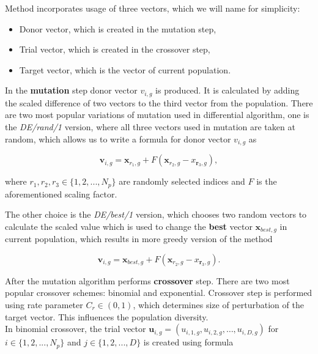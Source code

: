 \documentclass[12pt,a4paper,openany]{book}
\begin{document}
\noindent Method incorporates usage of three vectors, which we will name for simplicity:

\begin{itemize}
\item Donor vector, which is created in the mutation step,
\item Trial vector, which is created in the crossover step,
\item Target vector, which is the vector of current population.
\end{itemize}


\noindent In the \textbf{mutation} step donor vector $v_{i, g}$ is produced. It is calculated by adding the scaled difference of two vectors to the third vector from the population. There are two most popular variations of mutation used in differential algorithm, one is the \textit{DE/rand/1} version, where all three vectors used in mutation are taken at random, which allows us to write a formula for donor vector  $v_{i, g}$ as

\begin{equation}
\mathbf{v}_{i, g}=\mathbf{x}_{r_{1}, g}+F\left(\mathbf{x}_{r_{2}, g}-x_{\mathbf{r}_{3}, g}\right),
\end{equation}

\noindent where $r_{1}, r_{2},r_{3} \in \{1, 2, ..., N_{p}\}$ are randomly selected indices and $F$ is the aforementioned scaling factor.

\noindent The other choice is the \textit{DE/best/1} version, which chooses two random vectors to calculate the scaled value which is used to change the \textbf{best} vector $\mathbf{x}_{best, g}$ in current population, which results in more greedy version of the method

\begin{equation}
\mathbf{v}_{i, g}=\mathbf{x}_{best, g}+F\left(\mathbf{x}_{r_{2}, g}-x_{\mathbf{r}_{3}, g}\right).
\end{equation}

\noindent After the mutation algorithm performs \textbf{crossover} step. There are two most popular crossover schemes: binomial and exponential. Crossover step is performed using rate parameter $C_{r} \in \left(0, 1\right)$, which determines size of perturbation of the target vector. This influences the population diversity.\\
\noindent In binomial crossover, the trial vector $\mathbf{u}_{i, g}=\left(u_{i, 1, g}, u_{i, 2, g}, \ldots, u_{i, D, g}\right)$ for $i \in \{1, 2, ..., N_{p}\}$ and $j \in \{1, 2, ..., D\}$ is created using formula
\end{document}
